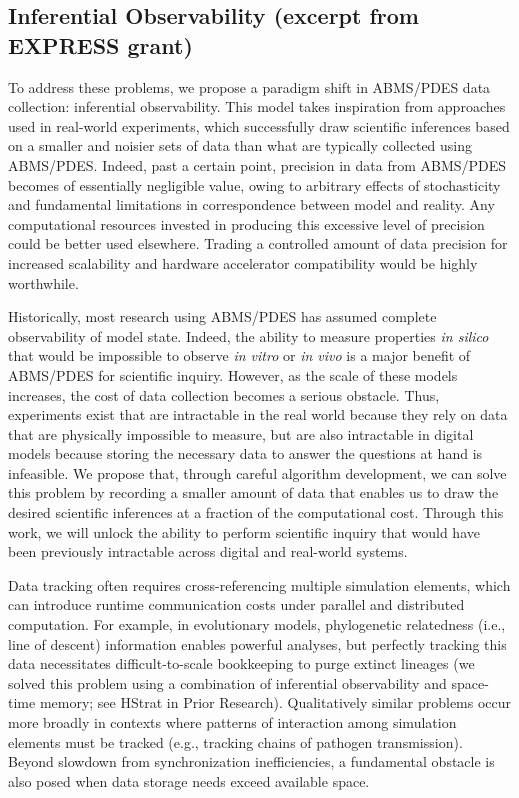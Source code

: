 \subsection{Inferential Observability (excerpt from EXPRESS grant)}

To address these problems, we propose a paradigm shift in ABMS/PDES data collection: inferential observability.
This model takes inspiration from approaches used in real-world experiments, which successfully draw scientific inferences based on a smaller and noisier sets of data than what are typically collected using ABMS/PDES.
Indeed, past a certain point, precision in data from ABMS/PDES becomes of essentially negligible value, owing to arbitrary effects of stochasticity and fundamental limitations in correspondence between model and reality.
Any computational resources invested in producing this excessive level of precision could be better used elsewhere.
Trading a controlled amount of data precision for increased scalability and hardware accelerator compatibility would be highly worthwhile.

Historically, most research using ABMS/PDES has assumed complete observability of model state.
Indeed, the ability to measure properties \textit{in silico} that would be impossible to observe \textit{in vitro} or \textit{in vivo} is a major benefit of ABMS/PDES for scientific inquiry.
However, as the scale of these models increases, the cost of data collection becomes a serious obstacle. %
Thus, experiments exist that are intractable in the real world because they rely on data that are physically impossible to measure, but are also intractable in digital models because storing the necessary data to answer the questions at hand is infeasible.
We propose that, through careful algorithm development, we can solve this problem by recording a smaller amount of data that enables us to draw the desired scientific inferences at a fraction of the computational cost.
Through this work, we will unlock the ability to perform scientific inquiry that would have been previously intractable across digital and real-world systems.

Data tracking often requires cross-referencing multiple simulation elements, which can introduce runtime communication costs under parallel and distributed computation.
For example, in evolutionary models, phylogenetic relatedness (i.e., line of descent) information enables powerful analyses, but perfectly tracking this data necessitates difficult-to-scale bookkeeping to purge extinct lineages \citep{moreno2024analysis} (we solved this problem using a combination of inferential observability and space-time memory; see HStrat in Prior Research).
Qualitatively similar problems occur more broadly in contexts where patterns of interaction among simulation elements must be tracked (e.g., tracking chains of pathogen transmission).
Beyond slowdown from synchronization inefficiencies, a fundamental obstacle is also posed when data storage needs exceed available space.

